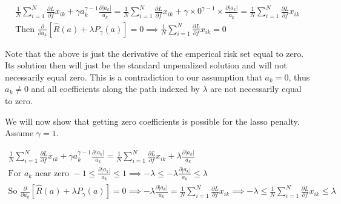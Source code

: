\documentclass[11pt]{article}
\begin{document}
\begin{gather*}
\frac{1}{N} \sum_{i = 1}^{N} \frac{\partial L}{\partial f} x_{ik} + 
\gamma a_{k}^{\gamma - 1} \frac{\partial |a_{k}|}{a_{k}} = 
\frac{1}{N} \sum_{i = 1}^{N} \frac{\partial L}{\partial f} x_{ik} + 
\gamma \times 0^{\gamma - 1} \times \frac{\partial |a_{k}|}{a_{k}} = 
\frac{1}{N} \sum_{i = 1}^{N} \frac{\partial L}{\partial f} x_{ik}\\
\text{Then } 
\frac{\partial}{\partial a_{k}} [\hat{R}(a) + \lambda P_{\gamma}(a)] = 0 \implies 
\frac{1}{N} \sum_{i = 1}^{N} \frac{\partial L}{\partial f} x_{ik} = 0
\end{gather*}

\vspace{5mm}
\noindent
Note that the above is just the derivative of the emperical risk set equal to 
zero. Its solution then will just be the standard unpenalized solution and 
will not necessarily equal zero. This is a contradiction to our assumption that 
$a_{k} = 0$, thus $a_{k} \ne 0$ and all coefficients along the path indexed by 
$\lambda$ are not necessarily equal to zero.

\vspace{5mm}
\noindent
We will now show that getting zero coefficients is possible for the lasso 
penalty. Assume $\gamma = 1$.

\begin{gather*}
\frac{1}{N} \sum_{i = 1}^{N} \frac{\partial L}{\partial f} x_{ik} + 
\gamma a_{k}^{\gamma - 1} \frac{\partial |a_{k}|}{a_{k}} = 
\frac{1}{N} \sum_{i = 1}^{N} \frac{\partial L}{\partial f} x_{ik} + 
\lambda \frac{\partial |a_{k}|}{a_{k}}\\
\text{For } a_{k} \text{ near zero } 
-1 \le \frac{\partial |a_{k}|}{a_{k}} \le 1 \implies 
-\lambda \le -\lambda \frac{\partial |a_{k}|}{a_{k}} \le \lambda\\
\text{So } 
\frac{\partial}{\partial a_{k}} [\hat{R}(a) + \lambda P_{\gamma}(a)] = 0 \implies 
-\lambda \frac{\partial |a_{k}|}{a_{k}} = 
\frac{1}{N} \sum_{i = 1}^{N} \frac{\partial L}{\partial f} x_{ik} \implies 
-\lambda \le \frac{1}{N} \sum_{i = 1}^{N} \frac{\partial L}{\partial f} x_{ik} \le \lambda
\end{gather*}
\end{document}
